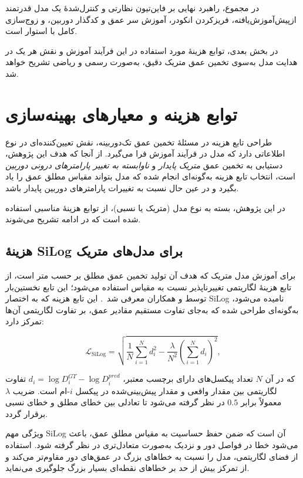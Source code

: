در مجموع، راهبرد نهایی بر فاین‌تیون نظارتی و کنترل‌شدهٔ یک مدل قدرتمند ازپیش‌آموزش‌یافته، فریزکردن انکودر، آموزش سر عمق و کدگذار دوربین، و زوج‌سازی کامل \proposedmodel{} با \controlmodel{} استوار است.

در بخش بعدی، توابع هزینهٔ مورد استفاده در این فرآیند آموزش و نقش هر یک در هدایت مدل به‌سوی تخمین عمق متریک دقیق، به‌صورت رسمی و ریاضی تشریح خواهد شد.
\section{توابع هزینه و معیارهای بهینه‌سازی}
\label{sec:loss_functions}

طراحی تابع هزینه در مسئلهٔ تخمین عمق تک‌دوربینه، نقش تعیین‌کننده‌ای در نوع اطلاعاتی دارد که مدل در فرآیند آموزش فرا می‌گیرد. از آنجا که هدف این پژوهش، دستیابی به تخمین عمق \emph{متریک پایدار} و \emph{ناوابسته به تغییر پارامترهای درونی دوربین} است، انتخاب تابع هزینه به‌گونه‌ای انجام شده که مدل بتواند مقیاس مطلق عمق را یاد بگیرد و در عین حال نسبت به تغییرات پارامترهای دوربین پایدار باشد.

در این پژوهش، بسته به نوع مدل (متریک یا نسبی)، از توابع هزینهٔ مناسبی استفاده شده است که در ادامه تشریح می‌شوند.

\subsection{هزینهٔ SiLog برای مدل‌های متریک}

برای آموزش مدل متریک که هدف آن تولید تخمین عمق مطلق بر حسب متر است، از تابع هزینهٔ لگاریتمی تغییرناپذیر نسبت به مقیاس استفاده می‌شود؛ این تابع نخستین‌بار توسط  و همکاران معرفی شد~\cite{Eigen2014Depth}. این تابع هزینه که به اختصار SiLog نامیده می‌شود، به‌گونه‌ای طراحی شده که به‌جای تفاوت مستقیم مقادیر عمق، بر تفاوت لگاریتمی آن‌ها تمرکز دارد:

\begin{equation}
\mathcal{L}_{\text{SiLog}} = \sqrt{\frac{1}{N} \sum_{i=1}^{N} d_i^2 - \frac{\lambda}{N^2} \left( \sum_{i=1}^{N} d_i \right)^2},
\end{equation}

که در آن $N$ تعداد پیکسل‌های دارای برچسب معتبر، $d_i = \log D_i^{GT} - \log D_i^{pred}$ تفاوت لگاریتمی بین مقدار واقعی و مقدار پیش‌بینی‌شده در پیکسل $i$-ام است. ضریب $\lambda$ معمولاً برابر $0.5$ در نظر گرفته می‌شود تا تعادلی بین خطای مطلق و خطای نسبی برقرار گردد.

ویژگی مهم SiLog آن است که ضمن حفظ حساسیت به مقیاس مطلق عمق، باعث می‌شود خطا در فواصل دور و نزدیک به‌صورت متعادل‌تری در نظر گرفته شود. استفاده از فضای لگاریتمی، مدل را نسبت به خطاهای بزرگ در عمق‌های دور مقاوم‌تر می‌کند و از تمرکز بیش از حد بر خطاهای نقطه‌ای بسیار بزرگ جلوگیری می‌نماید.

